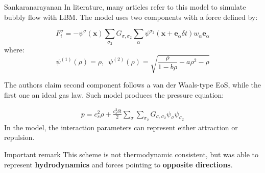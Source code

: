 \documentclass[8pt]{beamer}
\newcommand{\locx}{\mathbf{x}}
\newcommand{\vele}{\mathbf{e}_\alpha}
\begin{document}
	
	\begin{frame}[t]{Sankaranarayanan}
		In literature, many articles refer to this model to simulate bubbly flow with LBM. The model uses two components with a force defined by:
		
		\begin{equation}
			F_i^\sigma = - \psi^\sigma(\locx) \sum_{\sigma_2} G_{\sigma,\sigma_2} \sum_\alpha \psi^{\sigma_2} ( \locx + \vele \delta t)  w_\alpha \vele
		\end{equation}
		where:
		\begin{equation*}
			\psi^{(1)} (\rho) = \rho, \, \, \,  \psi^{(2)} (\rho) = \sqrt{\frac{\rho}{1-b\rho} - a \rho^2 - \rho}
		\end{equation*}
		
		The authors claim second component follows a van der Waals-type EoS, while the first one an ideal gas law. Such model produces the pressure equation:

		\begin{equation}
			\label{eq:pressureLBMPseudoP}
			\begin{split}
			p = c_s^2 \rho + \frac{c_s^2 \delta t}{2} \sum_\sigma \sum_{\sigma_2} G_{\sigma,\sigma_2} \psi_\sigma \psi_{\sigma_2} 
			\end{split}
		\end{equation}
		In the model, the interaction parameters can represent either attraction or repulsion.
		
		\begin{alertblock}{Important remark}
			This scheme is not thermodynamic consistent, but was able to represent \textbf{hydrodynamics} and forces pointing to \textbf{opposite directions}.
		\end{alertblock}
	\end{frame}
\end{document}
